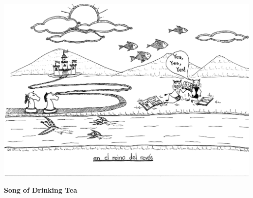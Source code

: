 \documentclass[11pt,a4paper]{article}
\begin{document}
\clearpage


\bigskip
\centerline{\includegraphics[page=6,scale=0.7,clip=true,trim = 6.9cm 3mm 0cm 3cm]{20150406235752619.pdf}}
\begin{center}\large\textbf{Song of Drinking Tea}\end{center}
\end{document}
